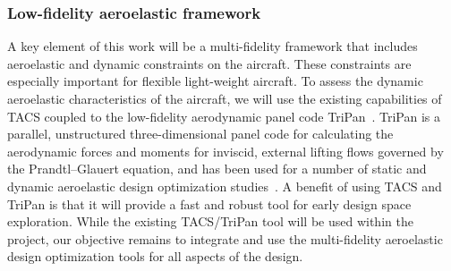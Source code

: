 \documentclass[]{aiaa-tc}
\begin{document}
\subsubsection{Low-fidelity aeroelastic framework}

A key element of this work will be a multi-fidelity framework that
includes aeroelastic and dynamic constraints on the aircraft.  These
constraints are especially important for flexible light-weight
aircraft.  To assess the dynamic aeroelastic characteristics of the
aircraft, we will use the existing capabilities of TACS coupled to the
low-fidelity aerodynamic panel code
TriPan~\cite{Kennedy:2014:tacs-tripan}. TriPan is a parallel,
unstructured three-dimensional panel code for calculating the
aerodynamic forces and moments for inviscid, external lifting flows
governed by the Prandtl--Glauert equation, and has been used for a
number of static and dynamic aeroelastic design optimization
studies~\cite{Kennedy:2014:tacs-tripan, Kennedy:2012:CMC,
  Kennedy:2013:SDM, Kennedy:2014:High-aspect-ratio,
  Kennedy:2014:Aviation}. A benefit of using TACS and TriPan is that
it will provide a fast and robust tool for early design space
exploration. While the existing TACS/TriPan tool will be used within
the project, our objective remains to integrate and use the
multi-fidelity aeroelastic design optimization tools for all aspects
of the design.



\end{document}
